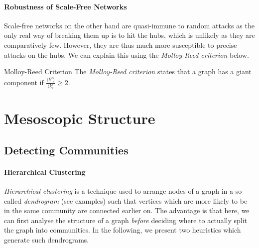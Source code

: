 \documentclass[english]{panikzettel}
\begin{document}
\paragraph{Robustness of Scale-Free Networks}
Scale-free networks on the other hand are quasi-immune to random attacks as the only real way of breaking them up is to hit the hubs, which is unlikely as they are comparatively few.
However, they are thus much more susceptible to precise attacks on the hubs.
We can explain this using the \emph{Molloy-Reed criterion} below.

\begin{defi}{Molloy-Reed Criterion}
    The \textit{Molloy-Reed criterion} states that a graph has a giant component if $\frac{\langle k^2 \rangle}{\langle k \rangle} \ge 2$.
\end{defi}

\section{Mesoscopic Structure}

\subsection{Detecting Communities}

\paragraph{Hierarchical Clustering}

\textit{Hierarchical clustering} is a technique used to arrange nodes of a graph in a so-called \textit{dendrogram} (see examples) such that vertices which are more likely to be in the same community are connected earlier on. The advantage is that here, we can first analyse the structure of a graph \textit{before} deciding where to actually split the graph into communities. In the following, we present two heuristics which generate such dendrograms.


\medskip
\end{document}

